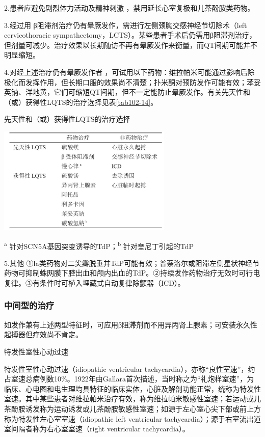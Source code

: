 2.患者应避免剧烈体力活动及精神刺激 ，禁用延长心室复极和儿茶酚胺类药物。

3.经过用 β阻滞剂治疗仍有晕厥发作，需进行左侧颈胸交感神经节切除术（left
cervicothoracic
sympathectomy，LCTS）。某些患者手术后仍需用β阻滞剂治疗，但剂量可减少。治疗效果以长期随访不再有晕厥发作来衡量，而QT间期可能并不明显缩短。

4.对经上述治疗仍有晕厥发作者
，可试用以下药物：维拉帕米可能通过影响后除极化而发挥作用，但长期口服的效果尚不清楚；扑米酮对预防发作可能有效；苯妥英钠、洋地黄，它们可缩短QT间期，但不一定能防止晕厥发作。有关先天性和（或）获得性LQTS的治疗选择见表\ref{tab102-14}。

\begin{table}[htbp]
\centering
\caption{先天性和（或）获得性LQTS的治疗选择}
\label{tab102-14}
\includegraphics[width=3.27083in,height=2.01042in]{./images/Image00448.jpg}
\end{table}

\textsuperscript{a} 针对SCN5A基因突变诱导的TdP；\textsuperscript{b}
针对奎尼丁引起的TdP

5.其他
①Ⅰa类药物对二尖瓣脱垂并TdP可能有效；普萘洛尔或阻滞左侧星状神经节药物可抑制蛛网膜下腔出血和颅内出血的TdP。②持续发作药物治疗无效时可行电复律。③有条件时可植入埋藏式自动复律除颤器（ICD）。

\subsubsection{中间型的治疗}

如发作兼有上述两型特征时，可应用β阻滞剂而不用异丙肾上腺素；可安装永久性起搏器但疗效尚不肯定。

\hypertarget{text00293.htmlux5cux23CHP10-2-6-2}{}
特发性室性心动过速

特发性室性心动过速（idiopathic ventricular
tachycardia），亦称“良性室速”，约占室速总病例数10\%。1922年由Gallara首次描述，当时称之为“礼炮样室速”，为临床、心电图和电生理均具特征的临床实体，心脏及解剖功能正常，统称为特发性室速。其中某些患者对维拉帕米治疗有效，称为维拉帕米敏感性室速；若运动或儿茶酚胺诱发称为运动诱发或儿茶酚胺敏感性室速；如源于左心室心尖下部或前上方称为特发性左心室室速（idiopathic
left ventricular
tachycardia）；源于右室流出道室间隔者称为右心室室速（right ventricular
tachycardia）。

